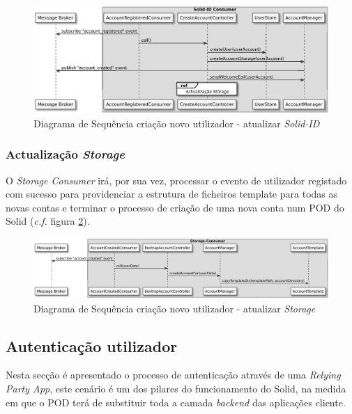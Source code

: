 \begin{figure}[H]
    \begin{center}
    \includegraphics[width=1 \textwidth]{figures/create_account_sd_diagram_2.eps}
    \caption{Diagrama de Sequência criação novo utilizador - atualizar \emph{Solid-ID}}
    \label{registo_conta_sd2}
    \end{center}
\end{figure}

\subsubsection{Actualização \emph{Storage}}

O \emph{Storage Consumer} irá, por sua vez, processar o evento de utilizador registado com sucesso para providenciar a estrutura de ficheiros template para todas as novas contas e terminar o processo de criação de uma nova conta num POD do Solid (\emph{c.f.} figura \ref{registo_conta_sd3}).

\begin{figure}[H]
    \begin{center}
    \includegraphics[width=1 \textwidth]{figures/create_account_sd_diagram_3.eps}
    \caption{Diagrama de Sequência criação novo utilizador - atualizar \emph{Storage}}
        \label{registo_conta_sd3}
    \end{center}
\end{figure}

\subsection{Autenticação utilizador \label{design_authentication}}
Nesta secção é apresentado o processo de autenticação através de uma \emph{Relying Party App}, este cenário é um dos pilares do funcionamento do Solid, na medida em que o POD terá de substituir toda a camada \emph{backend} das aplicações cliente.

